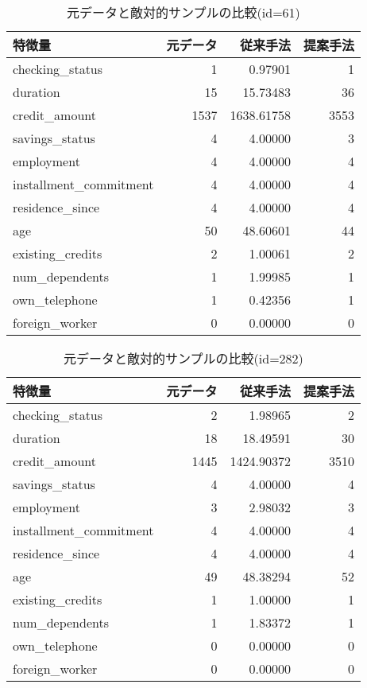 \begin{table}[H]
    \centering
    \caption{元データと敵対的サンプルの比較(id=61)}
    \begin{tabular}{|l|r|r|r|} \hline
        特徴量 & 元データ & 従来手法 & 提案手法 \\ \hline
        checking\_status & 1 & 0.97901 & 1 \\ \hline
        duration & 15 & 15.73483 & 36 \\ \hline
        credit\_amount & 1537 & 1638.61758 & 3553 \\ \hline
        savings\_status & 4 & 4.00000 & 3 \\ \hline
        employment & 4 & 4.00000 & 4 \\ \hline
        installment\_commitment & 4 & 4.00000 & 4 \\ \hline
        residence\_since & 4 & 4.00000 & 4 \\ \hline
        age & 50 & 48.60601 & 44 \\ \hline
        existing\_credits & 2 & 1.00061 & 2 \\ \hline
        num\_dependents & 1 & 1.99985 & 1 \\ \hline
        own\_telephone & 1 & 0.42356 & 1 \\ \hline
        foreign\_worker & 0 & 0.00000 & 0 \\ \hline
    \end{tabular}
\end{table}

\begin{table}[H]
    \centering
    \caption{元データと敵対的サンプルの比較(id=282)}
    \begin{tabular}{|l|r|r|r|} \hline
        特徴量 & 元データ & 従来手法 & 提案手法 \\ \hline
        checking\_status & 2 & 1.98965 & 2 \\ \hline
        duration & 18 & 18.49591 & 30 \\ \hline
        credit\_amount & 1445 & 1424.90372 & 3510 \\ \hline
        savings\_status & 4 & 4.00000 & 4 \\ \hline
        employment & 3 & 2.98032 & 3 \\ \hline
        installment\_commitment & 4 & 4.00000 & 4 \\ \hline
        residence\_since & 4 & 4.00000 & 4 \\ \hline
        age & 49 & 48.38294 & 52 \\ \hline
        existing\_credits & 1 & 1.00000 & 1 \\ \hline
        num\_dependents & 1 & 1.83372 & 1 \\ \hline
        own\_telephone & 0 & 0.00000 & 0 \\ \hline
        foreign\_worker & 0 & 0.00000 & 0 \\ \hline
    \end{tabular}
\end{table}


